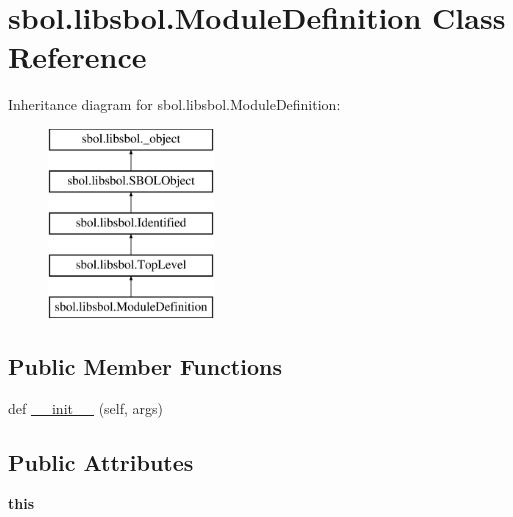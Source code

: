 \hypertarget{classsbol_1_1libsbol_1_1_module_definition}{}\section{sbol.\+libsbol.\+Module\+Definition Class Reference}
\label{classsbol_1_1libsbol_1_1_module_definition}
Inheritance diagram for sbol.\+libsbol.\+Module\+Definition\+:\begin{figure}[H]
\begin{center}
\leavevmode
\includegraphics[height=5.000000cm]{classsbol_1_1libsbol_1_1_module_definition}
\end{center}
\end{figure}
\subsection*{Public Member Functions}
\begin{DoxyCompactItemize}
\item 
def \hyperlink{classsbol_1_1libsbol_1_1_module_definition_a05b80625efcb0b70221a696ce800e1ba}{\+\_\+\+\_\+init\+\_\+\+\_\+} (self, args)
\end{DoxyCompactItemize}
\subsection*{Public Attributes}
\begin{DoxyCompactItemize}
\item 
{\bfseries this}\hypertarget{classsbol_1_1libsbol_1_1_module_definition_aef145d12a34c7618e9bbfe7b9d568017}{}\label{classsbol_1_1libsbol_1_1_module_definition_aef145d12a34c7618e9bbfe7b9d568017}

\end{DoxyCompactItemize}
